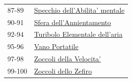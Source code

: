 \begin{multicols}{2}
{{\begin{tabularx}{\linewidth}{ll}
\rowcolor{gray!20}87-89 & \hyperlink{Specchio dell'Abilita' mentale}{Specchio dell'Abilita' mentale}\\
90-91 & \hyperlink{Sfera dell'Annientamento}{Sfera dell'Annientamento}\\
\rowcolor{gray!20}92-94 & \hyperlink{Turibolo Elementale dell'aria}{Turibolo Elementale dell'aria}\\
95-96 & \hyperlink{Vano Portatile}{Vano Portatile}\\
\rowcolor{gray!20}97-98 & \hyperlink{Zoccoli della Velocita'}{Zoccoli della Velocita'}\\
99-100 & \hyperlink{Zoccoli dello Zefiro}{Zoccoli dello Zefiro}
\end{tabularx}}

}

%

\end{multicols}

\pagebreak

